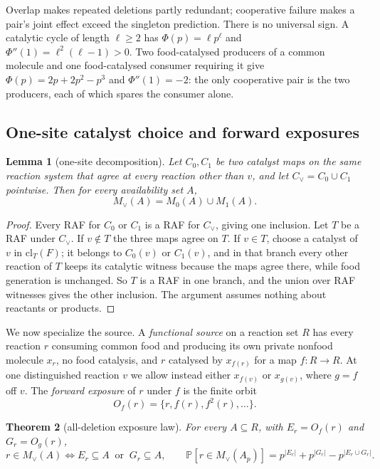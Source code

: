 \documentclass[11pt,a4paper]{article}
\theoremstyle{plain}
\newtheorem{theorem}{Theorem}[section]
\newtheorem{lemma}[theorem]{Lemma}
\theoremstyle{definition}
\theoremstyle{remark}
\renewcommand{\Pr}{\mathbb{P}}
\newcommand{\cl}{\mathrm{cl}}
\begin{document}
Overlap makes repeated deletions partly redundant; cooperative failure makes a pair's joint effect exceed the singleton prediction. There is no universal sign. A catalytic cycle of length $\ell\ge2$ has $\Phi(p)=\ell p^{\ell}$ and $\Phi''(1)=\ell^{2}(\ell-1)>0$. Two food-catalysed producers of a common molecule and one food-catalysed consumer requiring it give $\Phi(p)=2p+2p^{2}-p^{3}$ and $\Phi''(1)=-2$: the only cooperative pair is the two producers, each of which spares the consumer alone.

\subsection{One-site catalyst choice and forward exposures}

\begin{lemma}[one-site decomposition]\label{lem:onesite}
Let $C_0,C_1$ be two catalyst maps on the same reaction system that agree at every reaction other than $v$, and let $C_\vee=C_0\cup C_1$ pointwise. Then for every availability set $A$,
\[
M_\vee(A)=M_0(A)\cup M_1(A).
\]
\end{lemma}

\begin{proof}
Every RAF for $C_0$ or $C_1$ is a RAF for $C_\vee$, giving one inclusion. Let $T$ be a RAF under $C_\vee$. If $v\notin T$ the three maps agree on $T$. If $v\in T$, choose a catalyst of $v$ in $\cl_T(F)$; it belongs to $C_0(v)$ or $C_1(v)$, and in that branch every other reaction of $T$ keeps its catalytic witness because the maps agree there, while food generation is unchanged. So $T$ is a RAF in one branch, and the union over RAF witnesses gives the other inclusion. The argument assumes nothing about reactants or products.
\end{proof}

We now specialize the source. A \emph{functional source} on a reaction set $R$ has every reaction $r$ consuming common food and producing its own private nonfood molecule $x_r$, no food catalysis, and $r$ catalysed by $x_{f(r)}$ for a map $f:R\to R$. At one distinguished reaction $v$ we allow instead either $x_{f(v)}$ or $x_{g(v)}$, where $g=f$ off $v$. The \emph{forward exposure} of $r$ under $f$ is the finite orbit
\[
O_f(r)=\{r,f(r),f^{2}(r),\dots\}.
\]

\begin{theorem}[all-deletion exposure law]\label{thm:exposure}
For every $A\subseteq R$, with $E_r=O_f(r)$ and $G_r=O_g(r)$,
\[
r\in M_\vee(A)\iff E_r\subseteq A\ \text{ or }\ G_r\subseteq A,
\qquad
\Pr[r\in M_\vee(A_p)]=p^{|E_r|}+p^{|G_r|}-p^{|E_r\cup G_r|}.
\]
\end{theorem}
\end{document}

